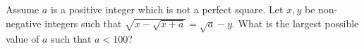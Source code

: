 Assume $a$ is a positive integer which is not a perfect square. Let $x,y$ be non-negative integers such that $\sqrt{x-\sqrt{x+a}} = \sqrt{a} - y$. What is the largest possible value of $a$ such that $a < 100$?
